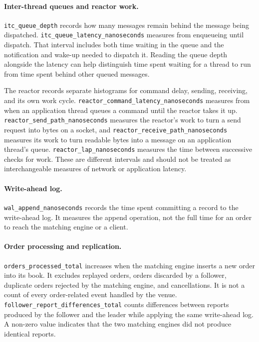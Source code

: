 \paragraph{Inter-thread queues and reactor work.}
\texttt{itc\_queue\_depth} records how many messages remain behind the message being
dispatched. \texttt{itc\_queue\_latency\_nanoseconds} measures from enqueueing until
dispatch. That interval includes both time waiting in the queue and the notification and
wake-up needed to dispatch it. Reading the queue depth alongside the latency can help
distinguish time spent waiting for a thread to run from time spent behind other queued
messages.

The reactor records separate histograms for command delay, sending, receiving, and its
own work cycle. \texttt{reactor\_command\_latency\_nanoseconds} measures from when an
application thread queues a command until the reactor takes it up.
\texttt{reactor\_send\_path\_nanoseconds} measures the reactor's work to turn a send
request into bytes on a socket, and
\texttt{reactor\_receive\_path\_nanoseconds} measures its work to turn readable bytes
into a message on an application thread's queue.
\texttt{reactor\_lap\_nanoseconds} measures the time between successive checks for work.
These are different intervals and should not be treated as interchangeable measures of
network or application latency.

\paragraph{Write-ahead log.}
\texttt{wal\_append\_nanoseconds} records the time spent committing a record to the
write-ahead log. It measures the append operation, not the full time for an order to reach
the matching engine or a client.

\paragraph{Order processing and replication.}
\texttt{orders\_processed\_total} increases when the matching engine inserts a new order
into its book. It excludes replayed orders, orders discarded by a follower, duplicate
orders rejected by the matching engine, and cancellations. It is not a count of every
order-related event handled by the venue.
\texttt{follower\_report\_differences\_total} counts differences between reports produced
by the follower and the leader while applying the same write-ahead log. A non-zero value
indicates that the two matching engines did not produce identical reports.

